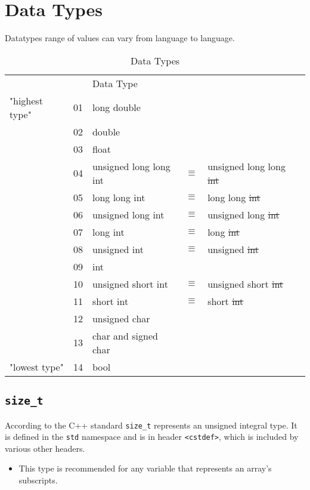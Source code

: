 \section{Data Types}
\label{sec:Data-Types}
Datatypes range of values can vary from language to language. 
\begin{table}[!h]
\centering
\begin{tabular}{llllll}
               &    & Data Type            &          &                    &   \\
"highest type" & 01 & long double          &          &                    &   \\
               & 02 & double               &          &                    &   \\
               & 03 & float                &          &                    &   \\
               & 04 & unsigned long long int   & $\equiv$ & unsigned long long \st{int}&   \\
               & 05 & long long int        & $\equiv$ & long long \st{int} &   \\
               & 06 & unsigned long int    & $\equiv$ & unsigned long \st{int} &   \\
               & 07 & long int             & $\equiv$ & long \st{int}      &   \\
               & 08 & unsigned int         & $\equiv$ & unsigned \st{int}  &   \\
               & 09 & int                  &          &                    &   \\
               & 10 & unsigned short int   & $\equiv$ & unsigned short \st{int} &   \\
               & 11 & short int            & $\equiv$ & short \st{int}     &   \\
               & 12 & unsigned char        &          &                    &   \\
               & 13 & char and signed char &          &                    &   \\
"lowest type"  & 14 & bool                 &          &                    &  
\end{tabular}
\caption{Data Types}
\label{tab:t_00_Data-types_Cpp}
\end{table}

\subsection{\texttt{size\_t}}
According to the C++ standard \texttt{size\_t} represents an unsigned integral type. It is defined in the \texttt{std} namespace and is in header \texttt{<cstdef>}, which is included by various other headers.

\begin{itemize}
    \item This type is recommended for any variable that represents an array's subscripts.
\end{itemize}